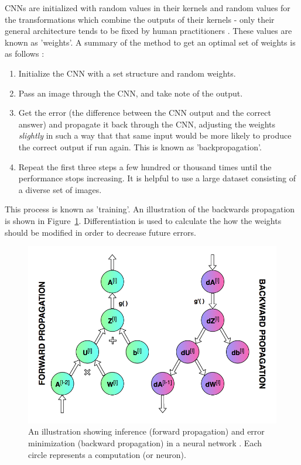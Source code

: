 CNNs are initialized with random values in their kernels and random values for the transformations which combine the outputs of their kernels - only their general architecture tends to be fixed by human practitioners \cite{website:cs231n_CNNs}. These values are known as 'weights'. A summary of the method to get an optimal set of weights is as follows \cite{werbos1974beyond}:

\begin{enumerate}
\item Initialize the CNN with a set structure and random weights.
\item Pass an image through the CNN, and take note of the output.
\item Get the error (the difference between the CNN output and the correct answer) and propagate it back through the CNN, adjusting the weights \emph{slightly} in such a way that that same input would be more likely to produce the correct output if run again. This is known as 'backpropagation'.
\item Repeat the first three steps a few hundred or thousand times until the performance stops increasing. It is helpful to use a large dataset consisting of a diverse set of images.
\end{enumerate}

This process is known as 'training'. An illustration of the backwards propagation is shown in Figure~\ref{fig:backprop_nn}. Differentiation is used to calculate the how the weights should be modified in order to decrease future errors.

\begin{figure}[h!]
  \centering
  \includegraphics[width=\textwidth]{literature_review/backprop_nn}
  \caption{\label{fig:backprop_nn}An illustration showing inference (forward propagation) and error minimization (backward propagation) in a neural network \cite{website:backprop_img}. Each circle represents a computation (or neuron).}
\end{figure}

